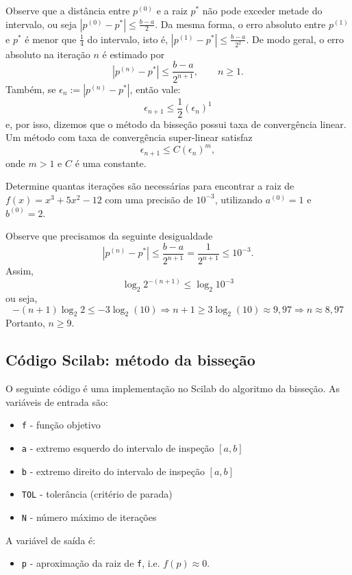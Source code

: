 Observe que a distância entre $p^{(0)}$ e a raiz $p^*$ não pode exceder metade do intervalo, ou seja $|p^{(0)}-p^*|\leq \frac{b-a}{2}$. Da mesma forma, o erro absoluto entre $p^{(1)}$ e $p^*$ é menor que $\frac{1}{4}$ do intervalo, isto é, $|p^{(1)}-p^*|\leq \frac{b-a}{2^2}$. De modo geral, o erro absoluto na iteração $n$ é estimado por
$$
|p^{(n)}-p^*|\leq \frac{b-a}{2^{n+1}},\qquad n\geq 1.
$$
Também, se $\epsilon_n:=|p^{(n)}-p^*|$, então vale:
$$
\epsilon_{n+1}\leq \frac{1}{2}\left(\epsilon_n\right)^1
$$
e, por isso, dizemos que o método da bisseção possui taxa de convergência linear. Um método com taxa de convergência super-linear satisfaz
$$
\epsilon_{n+1}\leq C\left(\epsilon_n\right)^m,
$$
onde $m>1$ e $C$ é uma constante.

\begin{ex}Determine quantas iterações são necessárias para encontrar a raiz de $f(x)=x^3+5x^2-12$ com uma precisão de $10^{-3}$, utilizando $a^{(0)}=1$ e $b^{(0)}=2$.

Observe que precisamos da seguinte desigualdade
$$
|p^{(n)}-p^*|\leq \frac{b-a}{2^{n+1}}= \frac{1}{2^{n+1}}\leq 10^{-3}.
$$
Assim,
$$
\log_{2}2^{-(n+1)}\leq \log_{2}10^{-3}
$$
ou seja,
$$
-(n+1)\log_{2}2\leq -3\log_2(10)\Rightarrow  n+1\geq 3\log_2(10)\approx 9,97\Rightarrow  n\approx 8,97
$$
Portanto, $n\geq 9$.
\end{ex}

\ifisscilab
\subsection{Código Scilab: método da bisseção}

O seguinte código é uma implementação no Scilab do algoritmo da bisseção. As variáveis de entrada são:
\begin{itemize}
\item \verb+f+ - função objetivo
\item \verb+a+ - extremo esquerdo do intervalo de inspeção $[a, b]$
\item \verb+b+ - extremo direito do intervalo de inspeção $[a, b]$
\item \verb+TOL+ - tolerância (critério de parada)
\item \verb+N+ - número máximo de iterações
\end{itemize}
A variável de saída é:
\begin{itemize}
\item \verb+p+ - aproximação da raiz de \verb+f+, i.e. $f(p) \approx 0$.
\end{itemize}

